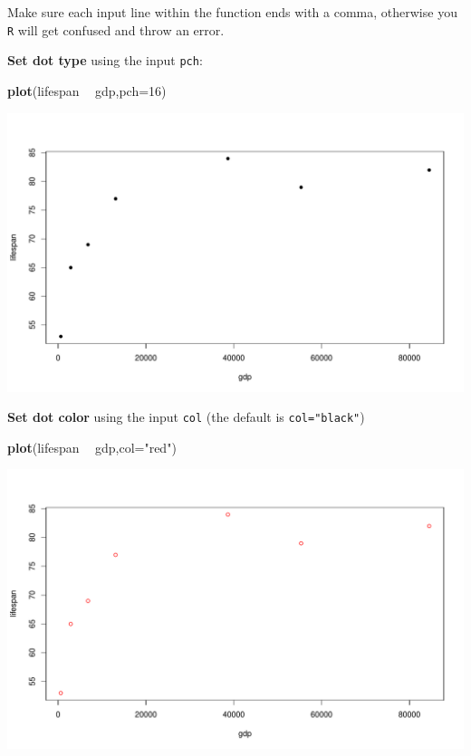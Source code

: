 \documentclass[
]{book}
\newenvironment{Shaded}{\begin{snugshade}}{\end{snugshade}}
\newcommand{\DataTypeTok}[1]{\textcolor[rgb]{0.13,0.29,0.53}{#1}}
\newcommand{\DecValTok}[1]{\textcolor[rgb]{0.00,0.00,0.81}{#1}}
\newcommand{\KeywordTok}[1]{\textcolor[rgb]{0.13,0.29,0.53}{\textbf{#1}}}
\newcommand{\NormalTok}[1]{#1}
\newcommand{\OperatorTok}[1]{\textcolor[rgb]{0.81,0.36,0.00}{\textbf{#1}}}
\newcommand{\StringTok}[1]{\textcolor[rgb]{0.31,0.60,0.02}{#1}}
\begin{document}
Make sure each input line within the function ends with a comma, otherwise you \texttt{R} will get confused and throw an error.

\textbf{Set dot type} using the input \texttt{pch}:

\begin{Shaded}
\begin{Highlighting}[]
\KeywordTok{plot}\NormalTok{(lifespan }\OperatorTok{~}\StringTok{ }\NormalTok{gdp,}\DataTypeTok{pch=}\DecValTok{16}\NormalTok{)}
\end{Highlighting}
\end{Shaded}

\includegraphics{figures/unnamed-chunk-106-1.pdf}

\textbf{Set dot color} using the input \texttt{col} (the default is \texttt{col="black"})

\begin{Shaded}
\begin{Highlighting}[]
\KeywordTok{plot}\NormalTok{(lifespan }\OperatorTok{~}\StringTok{ }\NormalTok{gdp,}\DataTypeTok{col=}\StringTok{"red"}\NormalTok{)}
\end{Highlighting}
\end{Shaded}

\includegraphics{figures/unnamed-chunk-107-1.pdf}
\end{document}
